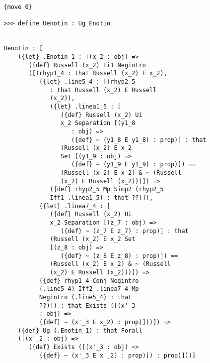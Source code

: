 \documentclass[12pt]{article}
\begin{document}
\begin{verbatim}
   {move 0}

   >>> define Uenotin : Ug Enotin


   Uenotin : [
       ({let} .Enotin_1 : [(x_2 : obj) => 
          ({def} Russell (x_2) Ei1 Negintro 
          ([(rhyp1_4 : that Russell (x_2) E x_2), 
             ({let} .line5_4 : [(rhyp2_5 
                : that Russell (x_2) E Russell 
                (x_2)), 
                ({let} .linea1_5 : [
                   ({def} Russell (x_2) Ui 
                   x_2 Separation [(y1_8 
                      : obj) => 
                      ({def} ~ (y1_8 E y1_8) : prop)] : that 
                   (Russell (x_2) E x_2 
                   Set [(y1_9 : obj) => 
                      ({def} ~ (y1_9 E y1_9) : prop)]) == 
                   (Russell (x_2) E x_2) & ~ (Russell 
                   (x_2) E Russell (x_2)))]) => 
                ({def} rhyp2_5 Mp Simp2 (rhyp2_5 
                Iff1 .linea1_5) : that ??)]), 
             ({let} .linea7_4 : [
                ({def} Russell (x_2) Ui 
                x_2 Separation [(z_7 : obj) => 
                   ({def} ~ (z_7 E z_7) : prop)] : that 
                (Russell (x_2) E x_2 Set 
                [(z_8 : obj) => 
                   ({def} ~ (z_8 E z_8) : prop)]) == 
                (Russell (x_2) E x_2) & ~ (Russell 
                (x_2) E Russell (x_2)))]) => 
             ({def} rhyp1_4 Conj Negintro 
             (.line5_4) Iff2 .linea7_4 Mp 
             Negintro (.line5_4) : that 
             ??)]) : that Exists ([(x'_3 
             : obj) => 
             ({def} ~ (x'_3 E x_2) : prop)]))]) => 
       ({def} Ug (.Enotin_1) : that Forall 
       ([(x'_2 : obj) => 
          ({def} Exists ([(x'_3 : obj) => 
             ({def} ~ (x'_3 E x'_2) : prop)]) : prop)]))]



\end{verbatim}
\end{document}
